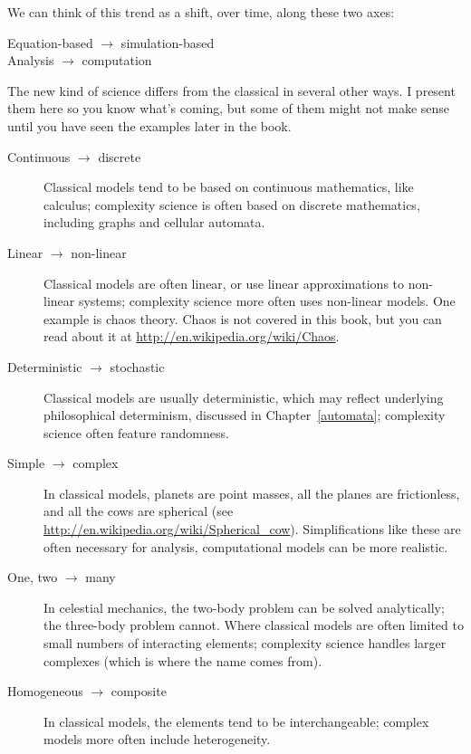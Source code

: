 \documentclass[10pt]{book}
\begin{document}
We can think of this trend as a shift, over time, along
these two axes:

\begin{description}

\item[Equation-based $\rightarrow$ simulation-based]

\item[Analysis $\rightarrow$ computation]

\end{description}

The new kind of science differs from the classical in several other
ways.  I present them here so you know what's coming, but some of them
might not make sense until you have seen the examples later in the
book.

\begin{description}

\item[Continuous $\rightarrow$ discrete] Classical models tend to be
  based on continuous mathematics, like calculus; complexity science
  is often based on discrete mathematics, including graphs and
  cellular automata.

\item[Linear $\rightarrow$ non-linear] Classical models are often
  linear, or use linear approximations to non-linear systems;
  complexity science more often uses non-linear models.  One example
  is chaos theory.  Chaos is not covered in this book, but you can
  read about it at \url{http://en.wikipedia.org/wiki/Chaos}.

\item[Deterministic $\rightarrow$ stochastic] Classical models
are usually deterministic, which may reflect underlying
philosophical determinism, discussed in Chapter~\ref{automata};
complexity science often feature randomness.

\item[Simple $\rightarrow$ complex] In classical models, planets are
  point masses, all the planes are frictionless, and all the cows are
  spherical (see \url{http://en.wikipedia.org/wiki/Spherical_cow}).
  Simplifications like these are often necessary for analysis,
  computational models can be more realistic.

\item[One, two $\rightarrow$ many] In celestial mechanics, the
  two-body problem can be solved analytically; the three-body problem
  cannot.  Where classical models are often limited to
  small numbers of interacting elements; complexity science handles
  larger complexes (which is where the name comes from).

\item[Homogeneous $\rightarrow$ composite] In classical models,
the elements tend to be interchangeable; complex models more often
include heterogeneity. 

\end{description}
\end{document}
